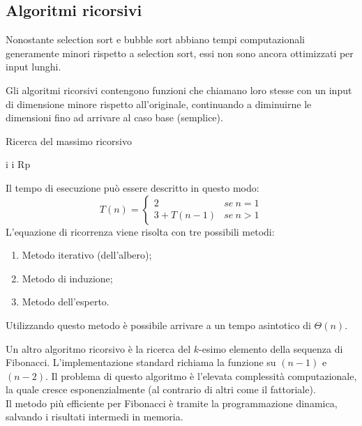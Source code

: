 \subsection{Algoritmi ricorsivi}
Nonostante selection sort e bubble sort abbiano tempi computazionali generamente minori rispetto a selection sort, essi non sono ancora ottimizzati per input lunghi. \par
Gli algoritmi ricorsivi contengono funzioni che chiamano loro stesse con un input di dimensione minore rispetto all'originale, continuando a diminuirne le dimensioni fino ad arrivare al caso base (semplice). \par
\begin{algorithm}
	\caption{Ricerca del massimo ricorsivo}
	\label{alg:rmr}
	\begin{algorithmic}
				\State \Return i
				\Else
					\State {}
					\State \Return i
				\Else
					\State \Return Rp
				\EndIf
			\EndIf
		\EndFunction
	\end{algorithmic}
\end{algorithm}
Il tempo di esecuzione può essere descritto in questo modo:
$$T(n) = \begin{cases}
	2 & se\ n = 1 \\
	3 + T(n - 1) & se\ n > 1
\end{cases}$$
L'equazione di ricorrenza viene risolta con tre possibili metodi:
\begin{enumerate}
	\item Metodo iterativo (dell'albero);
	\item Metodo di induzione;
	\item Metodo dell'esperto.
\end{enumerate}
Utilizzando questo metodo è possibile arrivare a un tempo asintotico di $\Theta(n)$. \par
Un altro algoritmo ricorsivo è la ricerca del $k$-esimo elemento della sequenza di Fibonacci. L'implementazione standard richiama la funzione su $(n - 1)$ e $(n-2)$. Il problema di questo algoritmo è l'elevata complessità computazionale, la quale cresce esponenzialmente (al contrario di altri come il fattoriale). \\
Il metodo più efficiente per Fibonacci è tramite la programmazione dinamica, salvando i risultati intermedi in memoria. \par

